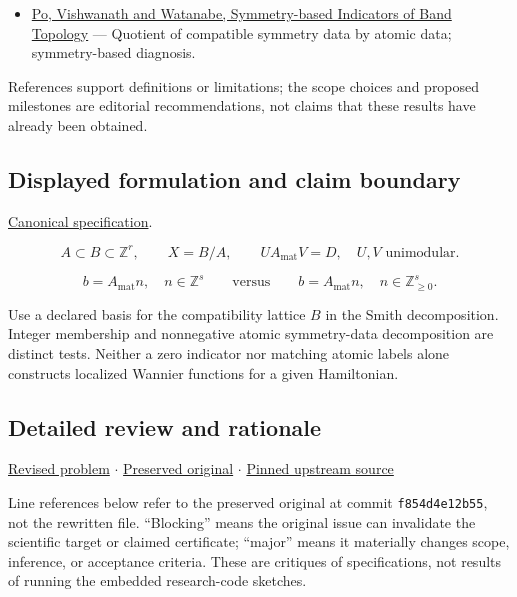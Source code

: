 \documentclass[
  11pt,
]{article}
\providecommand{\tightlist}{%
  \setlength{\itemsep}{0pt}\setlength{\parskip}{0pt}}
\begin{document}
\begin{itemize}
\tightlist
\item
  \href{https://arxiv.org/abs/1703.00911}{Po, Vishwanath and Watanabe,
  Symmetry-based Indicators of Band Topology} --- Quotient of compatible
  symmetry data by atomic data; symmetry-based diagnosis.
\end{itemize}

References support definitions or limitations; the scope choices and
proposed milestones are editorial recommendations, not claims that these
results have already been obtained.

\subsection{Displayed formulation and claim boundary}

\href{https://github.com/rick-stevens-ai/Pure-Thought/blob/main/PRDs/15-Topological-Quantum-Chemistry.md}{Canonical
specification}.

\[A\subset B\subset\mathbb Z^r,\qquad X=B/A,\qquad
UA_{\mathrm{mat}}V=D,\quad U,V\text{ unimodular}.\]

\[b=A_{\mathrm{mat}}n,\quad n\in\mathbb Z^s
\qquad\text{versus}\qquad b=A_{\mathrm{mat}}n,\quad n\in\mathbb Z_{\ge0}^s.\]

Use a declared basis for the compatibility lattice \(B\) in the Smith
decomposition. Integer membership and nonnegative atomic symmetry-data
decomposition are distinct tests. Neither a zero indicator nor matching
atomic labels alone constructs localized Wannier functions for a given
Hamiltonian.

\subsection{Detailed review and rationale}

\href{https://github.com/rick-stevens-ai/Pure-Thought/blob/main/PRDs/15-Topological-Quantum-Chemistry.md}{Revised
problem} \ensuremath{\cdot}
\href{https://github.com/rick-stevens-ai/Pure-Thought/blob/main/archive/original-PRDs/15-Topological-Quantum-Chemistry.md}{Preserved
original} \ensuremath{\cdot}
\href{https://github.com/rick-stevens-ai/Pure-Thought/blob/f854d4e12b55c1f5b5c2a964b75f2d23496d981e/PRDs/15-Topological-Quantum-Chemistry.md}{Pinned
upstream source}

Line references below refer to the preserved original at commit
\texttt{f854d4e12b55}, not the rewritten file. ``Blocking'' means the
original issue can invalidate the scientific target or claimed
certificate; ``major'' means it materially changes scope, inference, or
acceptance criteria. These are critiques of specifications, not results
of running the embedded research-code sketches.
\end{document}
